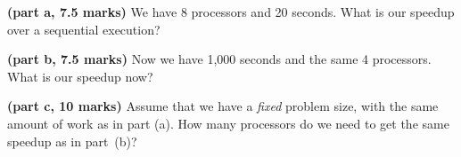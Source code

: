 \documentclass[12pt]{article}
\begin{document}
\vspace*{1em} \noindent
{\bf (part a, 7.5 marks)} We have 8 processors and 20 seconds.
What is our speedup over a sequential execution?

\vspace*{1em} \noindent
{\bf (part b, 7.5 marks)} Now we have 1,000 seconds and the same
4 processors. What is our speedup now?

\vspace*{1em} \noindent
{\bf (part c, 10 marks)} Assume that we have a \emph{fixed}
problem size, with the same amount of work as in part (a).
How many processors do we need to get the same speedup as in
part~(b)?


\end{document}
